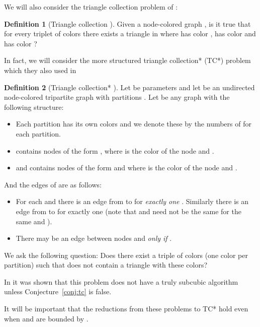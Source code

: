 \documentclass[a4paper,11pt]{article}
\theoremstyle{definition}
\newtheorem{definition}{Definition}
\begin{document}
We will also consider the triangle collection problem of \cite{AbboudVY15}:

\begin{definition}[Triangle collection \cite{AbboudVY15}]
    Given a node-colored graph , is it true that for every triplet of colors
     there exists a triangle  in  where  has color ,
     has color  and  has color ?
\end{definition}

In fact, we will consider the more structured triangle collection* (TC*)
problem which they also used in \cite{AbboudVY15}

\begin{definition}[Triangle collection* \cite{AbboudVY15}]
    Let  be parameters and let  be an undirected node-colored
    tripartite graph with partitions . Let  be any graph with the
    following structure:
    \begin{itemize}
        \item Each partition has its own  colors and we denote these by the
            numbers of  for each partition.
        \item  contains nodes of the form , where  is the
            color of the node and .
        \item  and  contains nodes of the form  and
             where  is the color of the node and .
    \end{itemize}
    And the edges of  are as follows:
    \begin{itemize}
        \item For each  and  there is an edge from
             to  for \emph{exactly one} . Similarly
            there is an edge from  to  for exactly one 
            (note that  and  need not be the same for the same  and
            ).
        \item There may be an edge between nodes  and
             \emph{only if} .
    \end{itemize}
    We ask the following question: Does there exist a triple of colors (one
    color per partition) such that  does not contain a triangle with these
    colors?
\end{definition}

In \cite{AbboudVY15} it was shown that this problem does not have a truly
subcubic algorithm unless Conjecture~\ref{conj:tc} is false.

It will be important that the reductions from these problems to TC* hold even
when  and  are bounded by .
\end{document}
